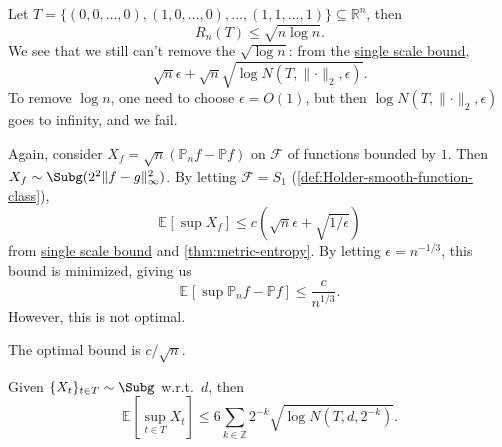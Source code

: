 \begin{eg}
	Let \(T = \{ (0, 0, \dots , 0), (1, 0, \dots , 0), \dots , (1, 1, \dots , 1) \} \subseteq \mathbb{R} ^n\), then
	\[
		R_n(T) \leq \sqrt{n \log n} .
	\]
	We see that we still can't remove the \(\sqrt{\log n}\): from the \hyperref[lma:single-scale-bound]{single scale bound},
	\[
		\sqrt{n} \epsilon + \sqrt{n} \sqrt{\log N(T, \lVert \cdot \rVert _2, \epsilon )}.
	\]
	To remove \(\log n\), one need to choose \(\epsilon = O(1)\), but then \(\log N(T, \lVert \cdot \rVert _2, \epsilon )\) goes to infinity, and we fail.
\end{eg}

\begin{eg}
	Again, consider \(X_f = \sqrt{n} (\mathbb{P} _n f - \mathbb{P} f)\) on \(\mathscr{F} \) of functions bounded by \(1\). Then \(X_f \sim \Subg(2^2 \lVert f-g \rVert _\infty ^2)\). By letting \(\mathscr{F} = S_1\) (\autoref{def:Holder-smooth-function-class}),
	\[
		\mathbb{E}_{}\left[\sup X_f \right]
		\leq c \left(  \sqrt{n} \epsilon + \sqrt{1 / \epsilon } \right)
	\]
	from \hyperref[lma:single-scale-bound]{single scale bound} and \autoref{thm:metric-entropy}. By letting \(\epsilon = n^{-1 / 3}\), this bound is minimized, giving us
	\[
		\mathbb{E}_{}\left[\sup \mathbb{P} _n f - \mathbb{P} f \right] \leq \frac{c}{n^{1 / 3}}.
	\]
	However, this is not optimal.
	\begin{remark}
		The optimal bound is \(c / \sqrt{n} \).
	\end{remark}
\end{eg}

\begin{theorem}\label{thm:Dudley-entropy-bound}
	Given \(\{ X_t \} _{t\in T} \sim \Subg\) w.r.t.\ \(d\), then
	\[
		\mathbb{E}_{}\left[\sup _{t\in T} X_t \right] \leq 6 \sum_{k\in \mathbb{Z} } 2^{-k} \sqrt{\log N(T, d, 2^{-k})} .
	\]
\end{theorem}